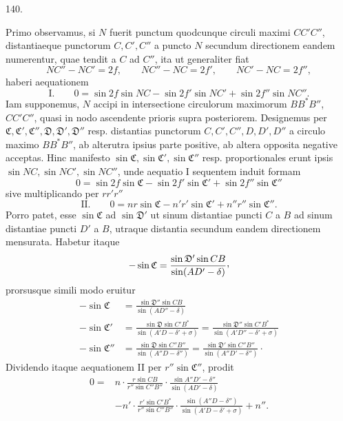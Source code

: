 \par{}\medskip
\begin{center}\hypertarget{native-187-article140}{}140.\end{center}
Primo observamus, si $N$ fuerit punctum quodcunque circuli maximi $CC'C''$,
distantiaeque punctorum $C,C',C''$ a puncto $N$ secundum directionem eandem
numerentur, quae tendit a $C$ ad $C''$, ita ut generaliter fiat
\[
NC''-NC'=2f,\qquad NC''-NC=2f',\qquad NC'-NC=2f'',
\]
haberi aequationem
\[
\text{I.}\qquad 0=\sin2f\sin NC-\sin2f'\sin NC'+\sin2f''\sin NC''.
\]
Iam supponemus, $N$ accipi in intersectione circulorum maximorum $BB^*B''$,
$CC'C''$, quasi in nodo ascendente prioris supra posteriorem. Designemus per
$\mathfrak{C},\mathfrak{C}',\mathfrak{C}'',\mathfrak{D},\mathfrak{D}',\mathfrak{D}''$ resp. distantias punctorum $C,C',C'',D,D',D''$ a circulo
maximo $BB^*B''$, ab alterutra ipsius parte positive, ab altera opposita negative
acceptas. Hinc manifesto $\sin\mathfrak{C},\sin\mathfrak{C}',\sin\mathfrak{C}''$ resp. proportionales erunt ipsis
$\sin NC,\sin NC',\sin NC''$, unde aequatio I sequentem induit formam
\[
0=\sin2f\sin\mathfrak{C}-\sin2f'\sin\mathfrak{C}'+\sin2f''\sin\mathfrak{C}''
\]
sive multiplicando per $rr'r''$
\hypertarget{native-188}{}
\[
\text{II.}\qquad 0=nr\sin\mathfrak{C}-n'r'\sin\mathfrak{C}'+n''r''\sin\mathfrak{C}''.
\]
Porro patet, esse $\sin\mathfrak{C}$ ad $\sin\mathfrak{D}'$ ut sinum distantiae puncti $C$ a $B$ ad sinum
distantiae puncti $D'$ a $B$, utraque distantia secundum eandem directionem mensurata. Habetur itaque
\[
-\sin\mathfrak{C}=\frac{\sin\mathfrak{D}'\sin CB}{\sin(AD'-\delta)}\mathpunct{\raisebox{.45ex}{,}}
\]
prorsusque simili modo eruitur
\[
\begin{aligned}
-\sin\mathfrak{C}&=\frac{\sin\mathfrak{D}''\sin CB}{\sin(AD''-\delta)}\\[.8ex]
-\sin\mathfrak{C}'&=\frac{\sin\mathfrak{D}\sin C'B^*}{\sin(A'D-\delta'+\sigma)}
=\frac{\sin\mathfrak{D}''\sin C'B^*}{\sin(A'D''-\delta'+\sigma)}\\[.8ex]
-\sin\mathfrak{C}''&=\frac{\sin\mathfrak{D}\sin C''B''}{\sin(A''D-\delta'')}
=\frac{\sin\mathfrak{D}'\sin C''B''}{\sin(A''D'-\delta'')}\mathpunct{\cdot}
\end{aligned}
\]
Dividendo itaque aequationem II per $r''\sin\mathfrak{C}''$, prodit
\[
\begin{aligned}
0={}&n\cdot\frac{r\sin CB}{r''\sin C''B''}\cdot\frac{\sin A''D'-\delta''}{\sin(AD'-\delta)}\\[.8ex]
&-n'\cdot\frac{r'\sin C'B^*}{r''\sin C''B''}\cdot\frac{\sin(A''D-\delta'')}{\sin(A'D-\delta'+\sigma)}+n''.
\end{aligned}
\]
